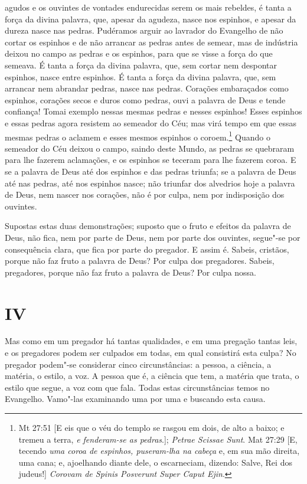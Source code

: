 agudos e os ouvintes de vontades endurecidas serem os mais rebeldes, é
tanta a força da divina palavra, que, apesar da agudeza, nasce nos
espinhos, e apesar da dureza nasce nas pedras.
Pudéramos arguir ao lavrador do Evangelho de não cortar os espinhos e de
não arrancar as pedras antes de semear, mas de indústria deixou no
campo as pedras e os espinhos, para que se visse a força do que semeava.
É tanta a força da divina palavra, que, sem cortar nem despontar
espinhos, nasce entre espinhos. É tanta a força da divina palavra, que,
sem arrancar nem abrandar pedras, nasce nas pedras. Corações embaraçados
como espinhos, corações secos e duros como pedras, ouvi a palavra de
Deus e tende confiança! Tomai exemplo nessas mesmas pedras e nesses
espinhos! Esses espinhos e essas pedras agora resistem ao semeador do
Céu; mas virá tempo em que essas mesmas pedras o aclamem e esses mesmos
espinhos o coroem.\footnote{Mt 27:51 [E eis que o véu do templo se rasgou em dois, de alto a baixo; e tremeu a terra, \textit{e fenderam-se as pedras}.]; \textit{Petrae Scissae Sunt}. Mat 27:29 [E, tecendo \textit{uma coroa de espinhos, puseram-lha na cabeça} e, em sua mão direita, uma cana; e, ajoelhando diante dele, o escarneciam, dizendo:
Salve, Rei dos judeus!] \textit{Corovam de Spinis Posverunt Super Caput Ejin}.}
Quando o semeador do Céu deixou o campo, saindo deste Mundo, as pedras
se quebraram para lhe fazerem aclamações, e os espinhos se teceram para
lhe fazerem coroa. E se a palavra de Deus até dos espinhos e das pedras
triunfa; se a palavra de Deus até nas pedras, até nos espinhos nasce;
não triunfar dos alvedrios hoje a palavra de Deus, nem nascer nos
corações, não é por culpa, nem por indisposição dos ouvintes.

Supostas estas duas demonstrações; suposto que o fruto e efeitos da
palavra de Deus, não fica, nem por parte de Deus, nem por parte dos
ouvintes, segue"-se por consequência clara, que fica por parte do
pregador. E assim é. Sabeis, cristãos, porque não faz fruto a palavra de
Deus? Por culpa dos pregadores. Sabeis, pregadores, porque não faz
fruto a palavra de Deus? Por culpa nossa.

\section*{IV}

Mas como em um pregador há tantas qualidades, e em uma pregação tantas
leis, e os pregadores podem ser culpados em todas,
em qual consistirá esta culpa? No pregador podem"-se considerar
cinco circunstâncias: a pessoa, a ciência, a matéria, o estilo, a voz. A
pessoa que é, a ciência que tem, a matéria que trata, o estilo que
segue, a voz com que fala. Todas estas circunstâncias temos no
Evangelho. Vamo"-las examinando uma por uma e buscando esta causa.

